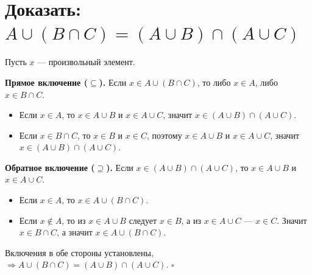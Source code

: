 \documentclass{article}
\begin{document}
\section*{Доказать: $A \cup (B \cap C) = (A \cup B) \cap (A \cup C)$}

Пусть $x$ — произвольный элемент.

\textbf{Прямое включение ($\subseteq$).}
Если $x \in A \cup (B \cap C)$, то либо $x \in A$, либо $x \in B \cap C$.

\begin{itemize}
\item Если $x \in A$, то $x \in A \cup B$ и $x \in A \cup C$, значит
$x \in (A \cup B) \cap (A \cup C)$.
\item Если $x \in B \cap C$, то $x \in B$ и $x \in C$, поэтому $x \in A \cup B$
и $x \in A \cup C$, значит $x \in (A \cup B) \cap (A \cup C)$.
\end{itemize}

\textbf{Обратное включение ($\supseteq$).}
Если $x \in (A \cup B) \cap (A \cup C)$, то $x \in A \cup B$ и $x \in A \cup C$.
\begin{itemize}
\item Если $x \in A$, то $x \in A \cup (B \cap C)$.
\item Если $x \notin A$, то из $x \in A \cup B$ следует $x \in B$, а из
$x \in A \cup C$ — $x \in C$. Значит $x \in B \cap C$, а значит
$x \in A \cup (B \cap C)$.
\end{itemize}

Включения в обе стороны установлены, $\Rightarrow A \cup (B \cap C) =
(A \cup B) \cap (A \cup C)$. $\square$
\end{document}
